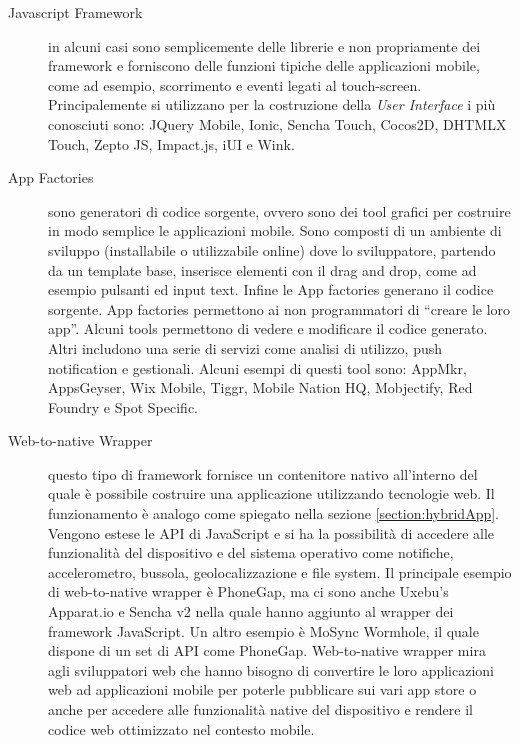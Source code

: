 \begin{description}

\item[Javascript Framework] in alcuni casi sono semplicemente delle librerie e non propriamente dei framework e forniscono delle funzioni tipiche delle applicazioni mobile, come ad esempio, scorrimento e eventi legati al touch-screen. Principalemente si utilizzano per la costruzione della \emph{User Interface} i più conosciuti sono: JQuery Mobile, Ionic, Sencha Touch, Cocos2D, DHTMLX Touch, Zepto JS, Impact.js, iUI e Wink.

\item[App Factories] sono generatori di codice sorgente, ovvero sono dei tool grafici per costruire in modo semplice le applicazioni mobile. Sono composti di un ambiente di sviluppo (installabile o utilizzabile online) dove lo sviluppatore, partendo da un template base, inserisce elementi con il drag and drop, come ad esempio pulsanti ed input text. Infine le App factories generano il codice sorgente. App factories permettono ai non programmatori di “creare le loro app”. Alcuni tools permettono di vedere e modificare il codice generato. Altri includono una serie di servizi come analisi di utilizzo, push notification e gestionali.
Alcuni esempi di questi tool sono: AppMkr, AppsGeyser, Wix Mobile, Tiggr, Mobile Nation HQ, Mobjectify, Red Foundry e Spot Specific.

\item[Web-to-native Wrapper] questo tipo di framework fornisce un contenitore nativo all'interno del quale è possibile costruire una applicazione utilizzando tecnologie web. Il funzionamento è analogo come spiegato nella sezione \ref{section:hybridApp}. Vengono estese le API di JavaScript e si ha la possibilità di accedere alle funzionalità del dispositivo e del sistema operativo come notifiche, accelerometro, bussola, geolocalizzazione e file system.
Il principale esempio di web-to-native wrapper è PhoneGap, ma ci sono anche Uxebu’s Apparat.io e Sencha v2 nella quale hanno aggiunto al wrapper dei framework JavaScript. Un altro esempio è MoSync Wormhole, il quale
dispone di un set di API come PhoneGap. Web-to-native wrapper mira agli sviluppatori web che hanno bisogno di convertire le loro applicazioni web ad applicazioni mobile per poterle pubblicare sui vari app store o anche per accedere alle funzionalità native del dispositivo e rendere il codice web ottimizzato nel contesto mobile.


\end{description}
